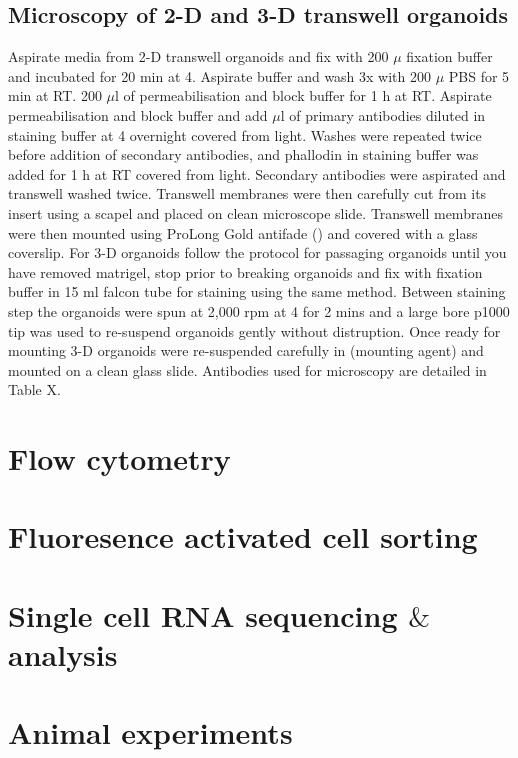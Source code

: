 \documentclass[a4paper]{report}
\begin{document}
\subsection{Microscopy of 2-D and 3-D transwell organoids}
Aspirate media from 2-D transwell organoids and fix with 200 $\mu$ fixation buffer and incubated for 20 min at 4. Aspirate buffer and wash 3x with 200 $\mu$ PBS for 5 min at RT. 200 $\mu$l of permeabilisation and block buffer for 1 h at RT. Aspirate permeabilisation and block buffer and add $\mu$l of primary antibodies diluted in staining buffer at 4 overnight covered from light. Washes were repeated twice before addition of secondary antibodies, and phallodin in staining buffer was added for 1 h at RT covered from light. Secondary antibodies were aspirated and transwell washed twice. Transwell membranes were then carefully cut from its insert using a scapel and placed on clean microscope slide. Transwell membranes were then mounted using ProLong Gold antifade () and covered with a glass coverslip.
\vspace{2mm}\newline For 3-D organoids follow the protocol for passaging organoids until you have removed matrigel, stop prior to breaking organoids and fix with fixation buffer in 15 ml falcon tube for staining using the same method. Between staining step the organoids were spun at 2,000 rpm at 4 for 2 mins and a large bore p1000 tip was used to re-suspend organoids gently without distruption. Once ready for mounting 3-D organoids were re-suspended carefully in (mounting agent) and mounted on a clean glass slide. 
\vspace{2mm}\newline Antibodies used for microscopy are detailed in Table X. 

\section{Flow cytometry}
\section{Fluoresence activated cell sorting}
\section{Single cell RNA sequencing $\&$ analysis}
\section{Animal experiments}
\end{document}
